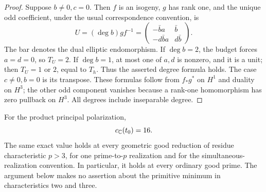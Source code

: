 \begin{proof}
Suppose $b\ne0,c=0$. Then $f$ is an isogeny, $g$ has rank one, and the
unique odd coefficient, under the usual correspondence convention, is
\[
 U=(\deg b)g f^{-1}
  =\begin{pmatrix}-\bar b a&\bar b\\
                  -d\bar b a&d\bar b\end{pmatrix}.
\]
The bar denotes the dual elliptic endomorphism. If $\deg b=2$, the
budget forces $a=d=0$, so $T_U=2$. If $\deg b=1$, at most one of $a,d$
is nonzero, and it is a unit; then $T_U=1$ or $2$, equal to $T_h$.
Thus the asserted degree formula holds. The case $c\ne0,b=0$ is its
transpose. These formulas follow from $f_*g^*$ on $H^1$ and duality on
$H^3$; the other odd component vanishes because a rank-one homomorphism
has zero pullback on $H^3$. All degrees include inseparable degree.
\end{proof}

\begin{theorem}
For the product principal polarization,
\[
 c_\mathbb C(t_0)=16.
\]
The same exact value holds at every geometric good reduction of residue
characteristic $p>3$, for one prime-to-$p$ realization and for the
simultaneous-realization convention. In particular, it holds at every
ordinary good prime. The argument below makes no assertion about the
primitive minimum in characteristics two and three.
\end{theorem}

